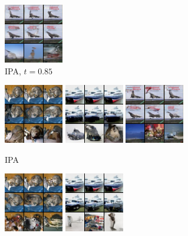 \begin{figure}[t]
\begin{subfigure}[t]{0.17\textwidth}
      \includegraphics[height=\cifarimgheight]{figs/cigcvae/image-samples/cifar10/freeform_aipo_3_t=0.85_samples}
      \caption{\scriptsize IPA, $t=0.85$}
    \end{subfigure}
    \begin{subfigure}[t]{0.17\textwidth}
      \centering
      \includegraphics[height=\cifarimgheight]{figs/cigcvae/image-samples/cifar10/freeform_aipo_0_samples}
      \includegraphics[height=\cifarimgheight]{figs/cigcvae/image-samples/cifar10/freeform_aipo_1_samples}
      \includegraphics[height=\cifarimgheight]{figs/cigcvae/image-samples/cifar10/freeform_aipo_3_samples}
      \caption{\scriptsize IPA}
    \end{subfigure}
    \begin{subfigure}[t]{0.17\textwidth}
      \centering
      \includegraphics[height=\cifarimgheight]{figs/cigcvae/image-samples/cifar10/freeform_aipo_0_imagenet_samples}
      \includegraphics[height=\cifarimgheight]{figs/cigcvae/image-samples/cifar10/freeform_aipo_1_imagenet_samples}

\end{subfigure}
\end{figure}
